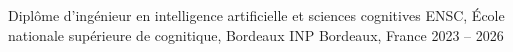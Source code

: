 
\begin{cventries}
  \cventry
    {Diplôme d’ingénieur en intelligence artificielle et sciences cognitives}
    {ENSC, École nationale supérieure de cognitique, Bordeaux INP}
    {Bordeaux, France}
    {2023 -- 2026}
    {}
\end{cventries}
